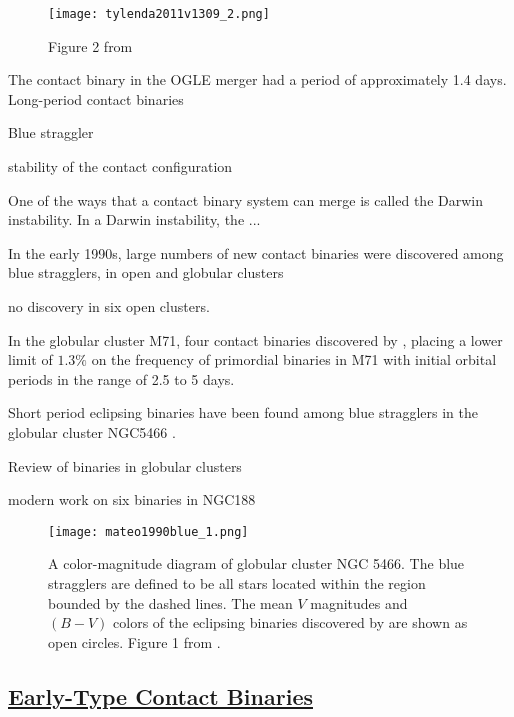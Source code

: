 \documentclass[12pt]{article} %
\numberwithin{equation}{section} %
\begin{document}
\begin{figure}[H]
\centering
\texttt{[image: tylenda2011v1309\_2.png]}
\caption{Figure 2 from \citet{tylenda2011v1309}}
\label{fig: tylenda2011v1309_2}
\end{figure}


The contact binary in the OGLE merger had a period of approximately 1.4 days. Long-period contact binaries \citep{rucinski1998eclipsing} 

Blue straggler \citet{andronov2006mergers}

stability of the contact configuration \citep{rasio1995minimum}

One of the ways that a contact binary system can merge is called the Darwin instability. In a Darwin instability, the ...

In the early 1990s, large numbers of new contact binaries were discovered among blue stragglers, in open and globular clusters 

\citep{kaluzny1988ccd} no discovery in six open clusters.

In the globular cluster M71, four contact binaries discovered by \citet{yan1994primordial}, placing a lower limit of $1.3\%$ on the frequency of primordial binaries in M71 with initial orbital periods in the range of 2.5 to 5 days. 

Short period eclipsing binaries have been found among blue stragglers in the globular cluster NGC5466 \citep{mateo1990blue}.

Review of binaries in globular clusters \citep{hut1992binaries}

modern work on six binaries in NGC188 \citep{chen2016physical}

\begin{figure}[H]
\centering
\texttt{[image: mateo1990blue\_1.png]}
\caption{A color-magnitude diagram of globular cluster NGC 5466. The blue stragglers are defined to be all stars located within the region bounded by the dashed lines. The mean $V$ magnitudes and $(B - V)$ colors of the eclipsing binaries discovered by \citet{mateo1990blue} are shown as open circles. Figure 1 from \citet{mateo1990blue}.}
\label{fig: mateo1990blue_1}
\end{figure}

\subsection[Early-Type Contact Binaries]{\hyperlink{to}{Early-Type Contact Binaries}}
\end{document}
